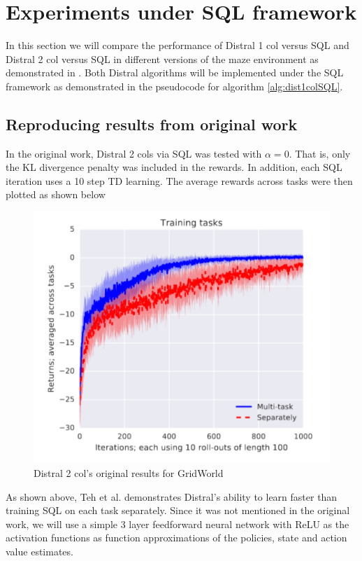 \documentclass[12pt]{report}
\begin{document}
\section{Experiments under SQL framework}
In this section we will compare the performance of Distral 1 col versus SQL and Distral 2 col versus SQL in different versions of the maze environment as demonstrated in  \cite{teh2017distral}. Both Distral algorithms will be implemented under the SQL framework as demonstrated in the pseudocode for algorithm \ref{alg:dist1colSQL}.

\subsection{Reproducing results from original work}

In the original work, Distral 2 cols via SQL was tested with $\alpha = 0$. That is, only the KL divergence penalty was included in the rewards. In addition, each SQL iteration uses a 10 step TD learning. The average rewards across tasks were then plotted as shown below
\begin{figure}[H]
    \center
    \includegraphics[width=0.5\linewidth]{figs/Distral_paper_res.png}
    \caption{Distral 2 col's original results for GridWorld}
\end{figure}
As shown above, Teh et al. \cite{teh2017distral} demonstrates Distral's ability to learn faster than training SQL on each task separately. Since it was not mentioned in the original work, we will use a simple 3 layer feedforward neural network with ReLU as the activation functions as function approximations of the policies, state and action value estimates.\\
\end{document}
